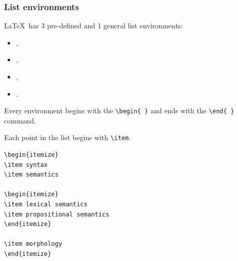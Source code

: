 \begin{frame}[fragile]
\frametitle{List environments}

\LaTeX\ has 3 pre-defined and 1 general list environments:

\begin{itemize}
	\item {},
	\item {},
	\item {},

	\item {}.
\end{itemize}

Every environment begins with the \lstinline|\begin{ }| and ends with the \lstinline|\end{ }| command.

Each point in the list begins with \lstinline|\item|.  
%
%

\begin{multicols}{2}
\begin{lstlisting}
\begin{itemize}
\item syntax
\item semantics 

\begin{itemize}
\item lexical semantics
\item propositional semantics
\end{itemize}

\item morphology
\end{itemize}
\end{lstlisting}
\columnbreak{}
\end{multicols}

\end{frame}

